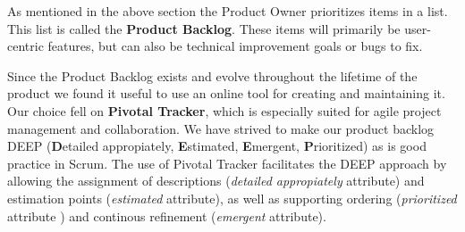 As mentioned in the above section the Product Owner prioritizes items in a list. This list is called the \textbf{Product Backlog}. These items will primarily be user-centric features, but can also be technical improvement goals or bugs to fix.

Since the Product Backlog exists and evolve throughout the lifetime of the product we found it useful to use an online tool for creating and maintaining it. Our choice fell on \textbf{Pivotal Tracker}, which is especially suited for agile project management and collaboration. We have strived to make our product backlog DEEP (\textbf{D}etailed appropiately, \textbf{E}stimated, \textbf{E}mergent, \textbf{P}rioritized) as is good practice in Scrum.
The use of Pivotal Tracker facilitates the DEEP approach by allowing the assignment of descriptions (\textit{detailed appropiately} attribute) and  estimation points (\textit{estimated} attribute), as well as supporting  ordering (\textit{prioritized} attribute ) and continous refinement (\textit{emergent} attribute).
